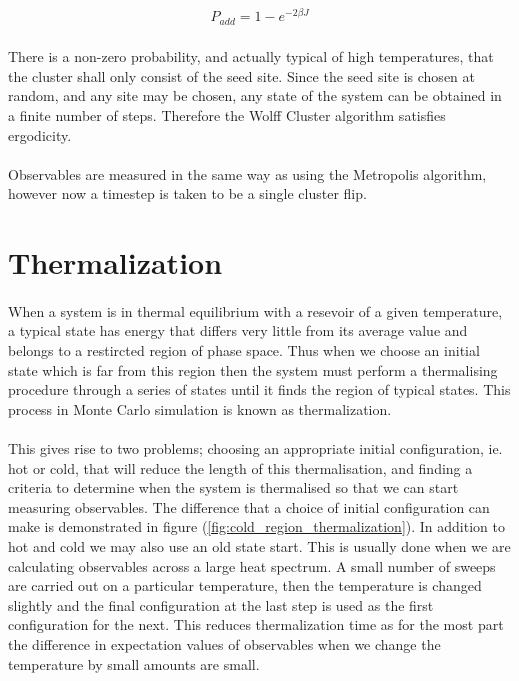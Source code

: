 \documentclass[12pt] {report} %
\begin{document}
				\begin{align}
					P_{add} = 1 - e^{-2 \beta J} \label{eq:P_add}
				\end{align}
					
				\paragraph{}
					There is a non-zero probability, and actually typical of high temperatures, that the cluster shall only consist of the seed site. Since the seed site is chosen at random, and any site may be chosen, any state of the system can be obtained in a finite number of steps. Therefore the Wolff Cluster algorithm satisfies ergodicity.
					
				\paragraph{}
					Observables are measured in the same way as using the Metropolis algorithm, however now a timestep is taken to be a single cluster flip.
					
					
			
			\section{Thermalization}	\label{sec:thermalization}
				\paragraph{}
					When a system is in thermal equilibrium with a resevoir of a given temperature, a typical state has energy that differs very little from its average value and belongs to a restircted region of phase space. Thus when we choose an initial state which is far from this region then the system must perform a thermalising procedure through a series of states until it finds the region of typical states. This process in Monte Carlo simulation is known as thermalization.
				\paragraph{}
					This gives rise to two problems; choosing an appropriate initial configuration, ie. hot or cold, that will reduce the length of this thermalisation, and finding a criteria to determine when the system is thermalised so that we can start measuring observables. The difference that a choice of initial configuration can make is demonstrated in figure (\ref{fig:cold_region_thermalization}). In addition to hot and cold we may also use an old state start. This is usually done when we are calculating observables across a large heat spectrum. A small number of sweeps are carried out on a particular temperature, then the temperature is changed slightly and the final configuration at the last step is used as the first configuration for the next. This reduces thermalization time as for the most part the difference in expectation values of observables when we change the temperature by small amounts are small.
			
\end{document}
